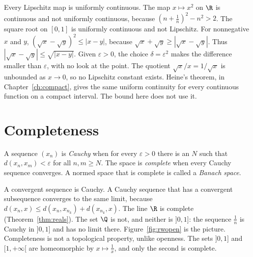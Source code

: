 Every Lipschitz map is uniformly continuous. The map $x\mapsto x^2$ on $\R$ is continuous and not uniformly continuous, because $(n+\frac1n)^2-n^2>2$. The square root on $[0,1]$ is uniformly continuous and not Lipschitz. For nonnegative $x$ and $y$, $(\sqrt x-\sqrt y)^2\le|x-y|$, because $\sqrt x+\sqrt y\ge|\sqrt x-\sqrt y|$. Thus $|\sqrt x-\sqrt y|\le\sqrt{|x-y|}$. Given $\varepsilon>0$, the choice $\delta=\varepsilon^2$ makes the difference smaller than $\varepsilon$, with no look at the point. The quotient $\sqrt x/x=1/\sqrt x$ is unbounded as $x\to0$, so no Lipschitz constant exists. Heine's theorem, in Chapter~\ref{ch:compact}, gives the same uniform continuity for every continuous function on a compact interval. The bound here does not use it.

\section{Completeness}

\begin{definition}
A sequence $(x_n)$ is \emph{Cauchy} when for every $\varepsilon>0$ there is an $N$ such that $d(x_n,x_m)<\varepsilon$ for all $n,m\ge N$. The space is \emph{complete} when every Cauchy sequence converges. A normed space that is complete is called a \emph{Banach space}.
\end{definition}

A convergent sequence is Cauchy. A Cauchy sequence that has a convergent subsequence converges to the same limit, because $d(x_n,x)\le d(x_n,x_{n_k})+d(x_{n_k},x)$. The line $\R$ is complete (Theorem~\ref{thm:reals}). The set $\Q$ is not, and neither is $]0,1]$: the sequence $\frac1n$ is Cauchy in $]0,1]$ and has no limit there. Figure~\ref{fig:rwopen} is the picture. Completeness is not a topological property, unlike openness. The sets $]0,1]$ and $[1,+\infty[$ are homeomorphic by $x\mapsto\frac1x$, and only the second is complete.


